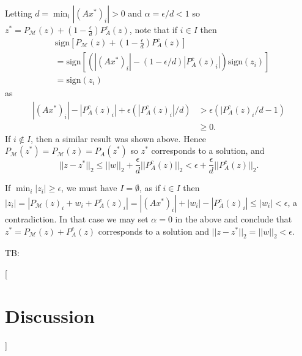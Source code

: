 \documentclass[12pt]{article}
\theoremstyle{definition}
\theoremstyle{remark}
\theoremstyle{definition}
\theoremstyle{problem}
\theoremstyle{definition}
\newcommand{\sign}{\text{sign}}
\newcommand{\MM}{\mathcal{M}}
\newcommand{\tb}[1]{{\color{blue}TB: {[#1]}}}
\begin{document}
Letting $d = \min_i|(Ax^*)_i| > 0$ and $\alpha = \epsilon/d<1$ so $z^* = P_{\MM}(z) + (1-\frac{\epsilon}{d})P_A^c(z)$, note that if $i\in I$ then
\[\begin{aligned}
&\sign\left[P_{\MM}(z) + (1-\frac{\epsilon}{d})P_A^c(z)\right] \\&= \sign\left[(|(Ax^*)_i|-(1-\epsilon/d)|P_A^c(z)_i|)\sign(z_i)\right] \\&= \sign(z_i)
\end{aligned}\]
as
\[\begin{aligned}
|(Ax^*)_i|-|P_A^c(z)_i|+\epsilon(|P_A^c(z)_i|/d)&>\epsilon\left(|P_A^c(z)_i/d - 1\right) \\& \geq 0.
\end{aligned}\]
 If $i\notin I$, then a similar result was shown above. Hence $P_{\MM}(z^*)=P_{\MM}(z) = P_A(z^*)$ so $z^*$ corresponds to a solution, and
\[||z-z^*||_2 \leq ||w||_2 + \frac{\epsilon}{d}||P_A^c(z)||_2 < \epsilon + \frac{\epsilon}{d}||P_A^c(z)||_2.\]

If $\min_i|z_i|\geq\epsilon$, we must have $I=\emptyset$, as if $i\in I$ then $|z_i| = |P_{\MM}(z)_i+w_i+P_A^c(z)_i|=|(Ax^*)_i| + |w_i| - |P_A^c(z)_i|\leq |w_i|<\epsilon$, a contradiction. In that case we may set $\alpha=0$ in the above and conclude that $z^* = P_{\MM}(z) + P_A^c(z)$ corresponds to a solution and $||z-z^*||_2 = ||w||_2<\epsilon$. 


\tb{\section{Discussion}}





\end{document}
